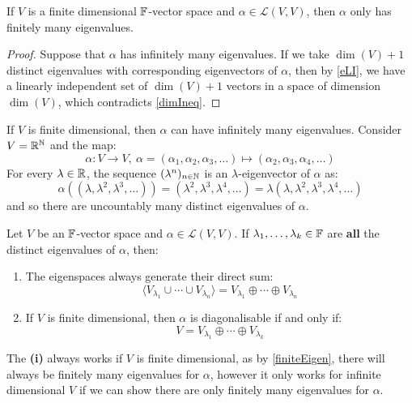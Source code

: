 \documentclass[../main.tex]{subfiles}
\begin{document}
\begin{corollary}
  If $V$ is a finite dimensional $\mathbb{F}$-vector space and $\alpha \in \mathcal{L}(V, V)$, then $\alpha$ only has finitely many eigenvalues. \label{finiteEigen}
\end{corollary}
\begin{proof}
  Suppose that $\alpha$ has infinitely many eigenvalues.
  If we take $\dim(V) + 1$ distinct eigenvalues with corresponding eigenvectors of $\alpha$, then by \cref{eLI}, we have a linearly independent set of $\dim(V) + 1$ vectors in a space of dimension $\dim(V)$, which contradicts \cref{dimIneq}.
\end{proof}
\begin{example}
  If $V$ is finite dimensional, then $\alpha$ can have infinitely many eigenvalues.
  Consider $V = \mathbb{R}^{\mathbb{N}}$ and the map:
  \[
    \alpha: V \to V,\ \alpha = (\alpha_1, \alpha_2, \alpha_3, \ldots) \mapsto (\alpha_2, \alpha_3, \alpha_4, \ldots)
  \]
  For every $\lambda \in \mathbb{R}$, the sequence $(\lambda^{n})_{n \in \mathbb{N}}$ is an $\lambda$-eigenvector of $\alpha$ as:
  \[
    \alpha((\lambda, \lambda^2, \lambda^3, \ldots)) = (\lambda^2, \lambda^3, \lambda^4, \ldots) = \lambda(\lambda, \lambda^2, \lambda^3, \lambda^4, \ldots)
  \]
  and so there are uncountably many distinct eigenvalues of $\alpha$.
\end{example}
\begin{proposition}
  Let $V$ be an $\mathbb{F}$-vector space and $\alpha \in \mathcal{L}(V, V)$.
  If $\lambda_1, \ldots, \lambda_k \in \mathbb{F}$ are \textbf{all} the distinct eigenvalues of $\alpha$, then: \label{eigenSpaceProp}
  \begin{enumerate}
    \item The eigenspaces always generate their direct sum:
      \[
        \langle V_{\lambda_1} \cup \cdots \cup V_{\lambda_n} \rangle = V_{\lambda_1} \oplus \cdots \oplus V_{\lambda_n}
      \]
    \item If $V$ is finite dimensional, then $\alpha$ is diagonalisable if and only if:
      \[
        V = V_{\lambda_1} \oplus \cdots \oplus V_{\lambda_k}
      \]
  \end{enumerate}
\end{proposition}
\begin{remark}
  The \textbf{(i)} always works if $V$ is finite dimensional, as by \cref{finiteEigen}, there will always be finitely many eigenvalues for $\alpha$, however it only works for infinite dimensional $V$ if we can show there are only finitely many eigenvalues for $\alpha$.
\end{remark}
\end{document}
